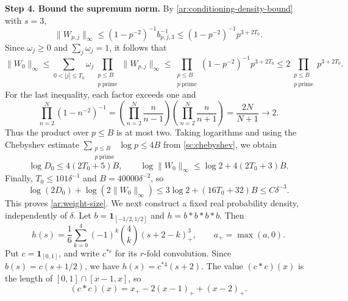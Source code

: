 \documentclass[twoside]{aomart}
\makeatletter
\theoremstyle{paperplain}
\theoremstyle{paperdefinition}
\renewenvironment{proof}[1][\proofname]{\par\pushQED{\qed}%
  \normalfont\topsep6\p@\@plus3\p@\relax\trivlist
  \item[\hskip\labelsep\itshape #1\@addpunct{.}]\ignorespaces
}{\popQED\endtrivlist\@endpefalse}
\numberwithin{equation}{section}
\makeatother
\begin{document}
\begin{proof}
\medskip
\noindent\textbf{Step 4. Bound the supremum norm.}
By \eqref{ar:conditioning-density-bound} with $s=3$,
\begin{equation*}
 \|W_{p,j}\|_\infty
 \le(1-p^{-2})^{-1}b_{p,j,3}^{-1}
 \le(1-p^{-2})^{-1}p^{3+2T_0}.
\end{equation*}
Since $\omega_j\ge0$ and $\displaystyle\sum_j\omega_j=1$, it follows that
\begin{equation*}
 \|W_0\|_\infty\le\sum_{0<|j|\le T_0}\omega_j\prod_{\substack{p\le B\\p\ \mathrm{prime}}}\|W_{p,j}\|_\infty\le\prod_{\substack{p\le B\\p\ \mathrm{prime}}}(1-p^{-2})^{-1}p^{3+2T_0}\le2\prod_{\substack{p\le B\\p\ \mathrm{prime}}}p^{3+2T_0}.
\end{equation*}
For the last inequality, each factor exceeds one and
\begin{equation*}
 \prod_{n=2}^{N}(1-n^{-2})^{-1}
 =\left(\prod_{n=2}^{N}\frac n{n-1}\right)
  \left(\prod_{n=2}^{N}\frac n{n+1}\right)
 =\frac{2N}{N+1}\longrightarrow2.
\end{equation*}
Thus the product over $p\le B$ is at most two. Taking
logarithms and using the Chebyshev estimate
$\displaystyle\sum_{\substack{p\le B\\p\ \mathrm{prime}}}\log p\le4B$ from \eqref{sc:chebyshev}, we obtain
\begin{equation*}
 \log D_0\le4(2T_0+5)B,\qquad
 \log\|W_0\|_\infty\le\log2+4(2T_0+3)B.
\end{equation*}
Finally, $T_0\le101\delta^{-1}$ and $B=40000\delta^{-2}$,
so
\begin{equation*}
 \log(2D_0)+\log(2\|W_0\|_\infty)
 \le3\log2+(16T_0+32)B\le C\delta^{-3}.
\end{equation*}
This proves \eqref{ar:weight-size}.
\end{proof}
We next construct a fixed real probability density, independently
of $\delta$. Let $b=\mathbf1_{[-1/2,1/2]}$ and $h=b*b*b*b$.
Then
\begin{equation}
 h(s)=\frac16\sum_{k=0}^4(-1)^k\binom4k(s+2-k)_+^3,
 \qquad a_+=\max(a,0).
 \label{ar:spline-formula}
\end{equation}
Put $c=\mathbf1_{[0,1]}$, and write $c^{*r}$ for its
$r$-fold convolution. Since $b(s)=c(s+1/2)$, we have
$h(s)=c^{*4}(s+2)$. The value $(c*c)(x)$ is the length
of $[0,1]\cap[x-1,x]$, so
\begin{equation*}
 (c*c)(x)=x_+-2(x-1)_++(x-2)_+.
\end{equation*}
\end{document}
